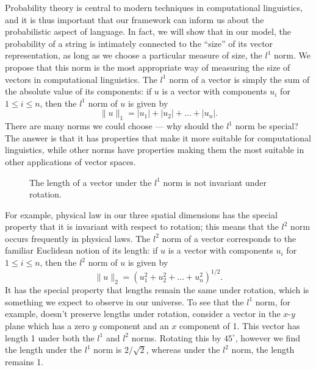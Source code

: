 Probability theory is central to modern techniques in computational linguistics, and it is thus important that our framework can inform us about the probabilistic aspect of language. In fact, we will show that in our model, the probability of a string is intimately connected to the ``size'' of its vector representation, as long as we choose a particular measure of size, the $l^1$ norm. We propose that this norm is the most appropriate way of measuring the size of vectors in computational linguistics.
The $l^1$ norm of a vector is simply the sum of the absolute value of its components:  if $u$ is a vector with components $u_i$ for $1 \le i \le n$, then the $l^1$ norm of $u$ is given by
$$\|u\|_1 = |u_1| + |u_2| +\ldots + |u_n|.$$
 There are many norms we could choose --- why should the $l^1$ norm be special? The answer is that it has properties that make it more suitable for computational linguistics, while other norms have properties making them the most suitable in other applications of vector spaces.
 
\begin{figure}
\begin{center}
\subfigure{}
\subfigure{}
\caption{The length of a vector under the $l^1$ norm is not invariant under rotation.}
\end{center}
\end{figure}

For example, physical law in our three spatial dimensions has the special property that it is invariant with respect to rotation; this means that the $l^2$ norm occurs frequently in physical laws. The $l^2$ norm of a vector corresponds to the familiar Euclidean notion of its length: if $u$ is a vector with components $u_i$ for $1 \le i \le n$, then the $l^2$ norm of $u$ is given by
$$\|u\|_2 = (u_1^2 + u_2^2 +\ldots + u_n^2)^{1/2}.$$
It has the special property that lengths remain the same under rotation, which is something we expect to observe in our universe. 
To see that the $l^1$ norm, for example, doesn't preserve lengths under rotation, consider a vector in the $x$-$y$ plane which has a zero $y$ component and an $x$ component of 1. This vector has length 1 under both the $l^1$ and $l^2$ norms. Rotating this by $45^\circ$, however we find the length under the $l^1$ norm is $2/\sqrt{2}$, whereas under the $l^2$ norm, the length remains 1.

